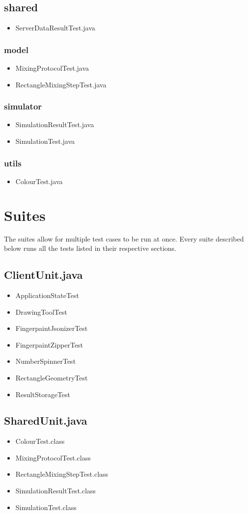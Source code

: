 \subsection{shared}
\begin{itemize}
\item ServerDataResultTest.java
\end{itemize}
\subsubsection{model}
\begin{itemize}
\item MixingProtocolTest.java
\item RectangleMixingStepTest.java
\end{itemize}
\subsubsection{simulator}
\begin{itemize}
\item SimulationResultTest.java
\item SimulationTest.java
\end{itemize}
\subsubsection{utils}
\begin{itemize}
\item ColourTest.java
\end{itemize}

\section{Suites}
The suites allow for multiple test cases to be run at once. Every suite described below runs all the tests listed in their respective sections.

\subsection{ClientUnit.java}
\begin{itemize}
\item 	ApplicationStateTest
\item 	DrawingToolTest
\item 	FingerpaintJsonizerTest
\item 	FingerpaintZipperTest
\item 	NumberSpinnerTest
\item 	RectangleGeometryTest
\item 	ResultStorageTest
\end{itemize}

\subsection{SharedUnit.java}
\begin{itemize}
\item ColourTest.class
\item	MixingProtocolTest.class
\item	RectangleMixingStepTest.class
\item	SimulationResultTest.class
\item	SimulationTest.class
\end{itemize}